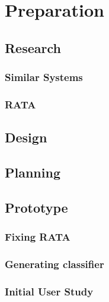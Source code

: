 \chapter{Preparation}
	\section{Research}
		\subsection{Similar Systems}
		\subsection{RATA}
	\section{Design}
	\section{Planning}
	\section{Prototype}
		\subsection{Fixing RATA}
		\subsection{Generating classifier}
		\subsection{Initial User Study}